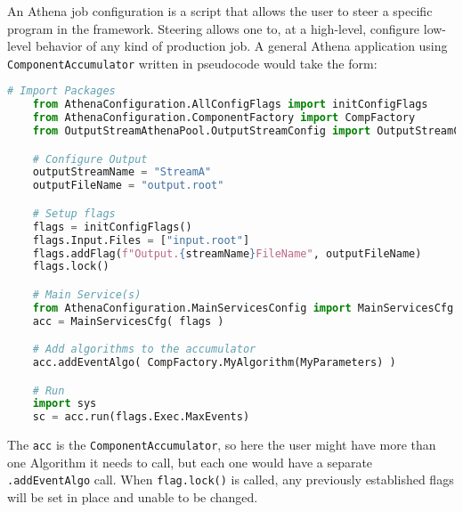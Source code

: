 
An Athena job configuration is a script that allows the user to steer a specific program in the framework.
Steering allows one to, at a high-level, configure low-level behavior of any kind of production job. 
A general Athena application using \verb|ComponentAccumulator| written in pseudocode would take the form: 
\begin{lstlisting}[language=Python]
    # Import Packages
    from AthenaConfiguration.AllConfigFlags import initConfigFlags
    from AthenaConfiguration.ComponentFactory import CompFactory
    from OutputStreamAthenaPool.OutputStreamConfig import OutputStreamCfg, outputStreamName

    # Configure Output
    outputStreamName = "StreamA"
    outputFileName = "output.root"

    # Setup flags
    flags = initConfigFlags()
    flags.Input.Files = ["input.root"]
    flags.addFlag(f"Output.{streamName}FileName", outputFileName)
    flags.lock()

    # Main Service(s)
    from AthenaConfiguration.MainServicesConfig import MainServicesCfg
    acc = MainServicesCfg( flags )

    # Add algorithms to the accumulator
    acc.addEventAlgo( CompFactory.MyAlgorithm(MyParameters) )

    # Run
    import sys
    sc = acc.run(flags.Exec.MaxEvents)
\end{lstlisting}

The \verb|acc| is the \verb|ComponentAccumulator|, so here the user might have more than one Algorithm it needs to call, but each one would have a separate \verb|.addEventAlgo| call. 
When \verb|flag.lock()| is called, any previously established flags will be set in place and unable to be changed. 